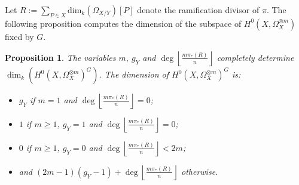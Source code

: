 \documentclass[11pt]{article} %
\newtheorem{prop}{Proposition}
\begin{document}
Let $R := \sum_{P\in X} \textrm{dim}_k (\Omega_{X/Y}) [P]$ denote the ramification divisor of $\pi$. 
The following proposition computes the dimension of the subspace of $H^0(X,\Omega_X^{\otimes m})$ fixed by $G$.

  \begin{prop}\label{dim1}
    The variables $m,\ g_Y$ and $\deg \left\lfloor\frac{m\pi_*(R)}{n} \right\rfloor$ completely determine $\dim_k(H^0(X,\Omega_X^{\otimes m})^G)$.
    The dimension of $H^0(X,\Omega_X^{\otimes m})^G$ is:
      \begin{itemize}
	\item $g_Y$ if $m=1$ and $\deg \left\lfloor\frac{m\pi_*(R)}{n} \right\rfloor=0$;
	\item $1$ if $m\geq 1$, $g_Y=1$ and $\deg \left\lfloor\frac{m\pi_*(R)}{n} \right\rfloor=0$;
	\item $0$ if $m\geq 1$, $g_Y=0$ and $\deg \left\lfloor\frac{m\pi_*(R)}{n} \right\rfloor< 2m$;
	\item and $(2m-1)(g_Y-1)+\deg \left\lfloor\frac{m\pi_*(R)}{n} \right\rfloor$ otherwise.
      \end{itemize}
  \end{prop}
\end{document}
